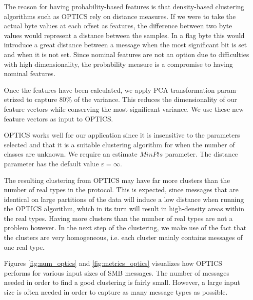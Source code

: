 \documentclass[a4paper]{report}
\begin{document}
The reason for having probability-based features is that density-based
clustering algorithms such as OPTICS rely on distance measures. If we were to
take the actual byte values at each offset as features, the difference between
two byte values would represent a distance between the samples. In a flag byte
this would introduce a great distance between a message when the most
significant bit is set and when it is not set. Since nominal features are not
an option due to difficulties with high dimensionality, the probability
measure is a compromise to having nominal features.

Once the features have been calculated, we apply PCA transformation
param-etrized to capture $80\%$ of the variance. This reduces the
dimensionality of our feature vectors while conserving the most significant
variance. We use these new feature vectors as input to OPTICS.

OPTICS works well for our application since it is insensitive to the parameters
selected and that it is a suitable clustering algorithm for when the number of
classes are unknown. We require an estimate $MinPts$ parameter. The distance
parameter has the default value $\varepsilon = \infty$.

The resulting clustering from OPTICS may have far more clusters than the number
of real types in the protocol. This is expected, since messages that are
identical on large partitions of the data will induce a low distance when
running the OPTICS algorithm, which in its turn will result in high-density
areas within the real types. Having more clusters than the number of real
types are not a problem however. In the next step of the clustering, we make
use of the fact that the clusters are very homogeneous, i.e. each cluster mainly
contains messages of one real type.

Figures \ref{fig:num_optics} and \ref{fig:metrics_optics} visualizes how OPTICS
performs for various input sizes of SMB messages. The number of messages needed
in order to find a good clustering is fairly small. However, a large input size
is often needed in order to capture as many message types as possible.
\end{document}
